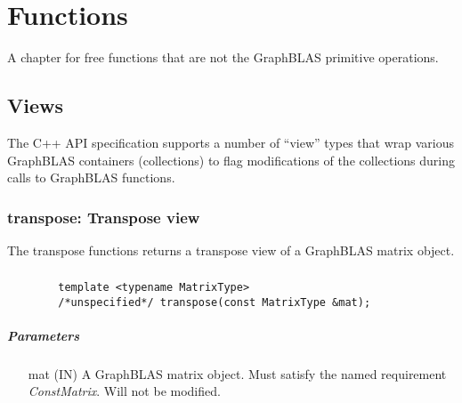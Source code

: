 \chapter{Functions}
\label{Chp:Functions}

A chapter for free functions that are not the GraphBLAS primitive operations.

\section{Views}

The C++ API specification supports a number of ``view'' types that wrap various
GraphBLAS containers (collections) to flag modifications of the collections
during calls to GraphBLAS functions.

\subsection{{\sf transpose}: Transpose view}

The {\sf transpose} functions returns a transpose view of a GraphBLAS matrix object.


\paragraph{\syntax}

\begin{verbatim}
        template <typename MatrixType>
        /*unspecified*/ transpose(const MatrixType &mat);
\end{verbatim}


\paragraph{Parameters}

\begin{itemize}%
  \item[{\sf mat}] ({\sf IN}) A GraphBLAS matrix object.  Must satisfy the named requirement \textit{ConstMatrix}.  Will not be modified.
\end{itemize}

